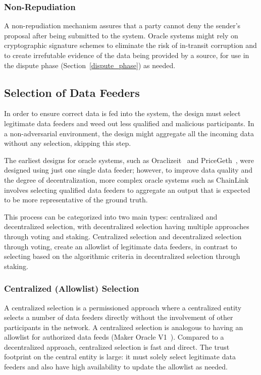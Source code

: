 \subsubsection{Non-Repudiation} 
A non-repudiation mechanism assures that a party cannot deny the sender's proposal after being submitted to the system. Oracle systems might rely on cryptographic signature schemes to eliminate the risk of in-transit corruption and to create irrefutable evidence of the data being provided by a source, for use in the dispute phase (Section~\ref{dispute_phase}) as needed.




\subsection{Selection of Data Feeders}\label{data_feeder_selection} 

In order to ensure correct data is fed into the system, the design must select legitimate data feeders and weed out less qualified and malicious participants. In a non-adversarial environment, the design might aggregate all the incoming data without any selection, skipping this step.

The earliest designs for oracle systems, such as Oraclizeit~\cite{bernanioraclize} and PriceGeth~\cite{eskandari2017feasibility}, were designed using just one single data feeder; however, to improve data quality and the degree of decentralization, more complex oracle systems such as ChainLink~\cite{ellis2017chainlink} involves selecting qualified data feeders to aggregate an output that is expected to be more representative of the ground truth.

This process can be categorized into two main types: centralized and decentralized selection, with decentralized selection having multiple approaches through voting and staking. Centralized selection and decentralized selection through voting, create an allowlist of legitimate data feeders, in contrast to selecting based on the algorithmic criteria in decentralized selection through staking. 

\subsubsection{Centralized (Allowlist) Selection} A centralized selection is a permissioned approach where a centralized entity selects a number of data feeders directly without the involvement of other participants in the network. A centralized selection is analogous to having an allowlist for authorized data feeds (\eg Maker Oracle V1~\cite{MAKERDAOOracle}). 
Compared to a decentralized approach, centralized selection is fast and direct. The trust footprint on the central entity is large: it must solely select legitimate data feeders and also have high availability to update the allowlist as needed.


